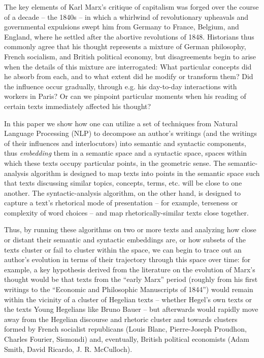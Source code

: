 The key elements of Karl Marx's critique of capitalism was forged over the course of a decade -- the 1840s -- in which a whirlwind of revolutionary upheavals and governmental expulsions swept him from Germany to France, Belgium, and England, where he settled after the abortive revolutions of 1848. Historians thus commonly agree that his thought represents a mixture of German philosophy, French socialism, and British political economy, but disagreements begin to arise when the details of this mixture are interrogated: What particular concepts did he absorb from each, and to what extent did he modify or transform them? Did the influence occur gradually, through e.g. his day-to-day interactions with workers in Paris? Or can we pinpoint particular moments when his reading of certain texts immediately affected his thought?

In this paper we show how one can utilize a set of techniques from Natural Language Processing (NLP) to decompose an author's writings (and the writings of their influences and interlocutors) into semantic and syntactic components, thus \textit{embedding} them in a semantic space and a syntactic space, spaces within which these texts occupy particular points, in the geometric sense. The semantic-analysis algorithm is designed to map texts into points in the semantic space such that texts discussing similar topics, concepts, terms, etc. will be close to one another. The syntactic-analysis algorithm, on the other hand, is designed to capture a text's rhetorical mode of presentation -- for example, terseness or complexity of word choices -- and map rhetorically-similar texts close together.

Thus, by running these algorithms on two or more texts and analyzing how close or distant their semantic and syntactic embeddings are, or how subsets of the texts cluster or fail to cluster within the space, we can begin to trace out an author's evolution in terms of their trajectory through this space over time: for example, a key hypothesis derived from the literature on the evolution of Marx's thought would be that texts from the ``early Marx'' period (roughly from his first writings to the ``Economic and Philosophic Manuscripts of 1844'') would remain within the vicinity of a cluster of Hegelian texts -- whether Hegel's own texts or the texts Young Hegelians like Bruno Bauer -- but afterwards would rapidly move away from the Hegelian discourse and rhetoric cluster and towards clusters formed by French socialist republicans (Louis Blanc, Pierre-Joseph Proudhon, Charles Fourier, Sismondi) and, eventually, British political economists (Adam Smith, David Ricardo, J. R. McCulloch).

